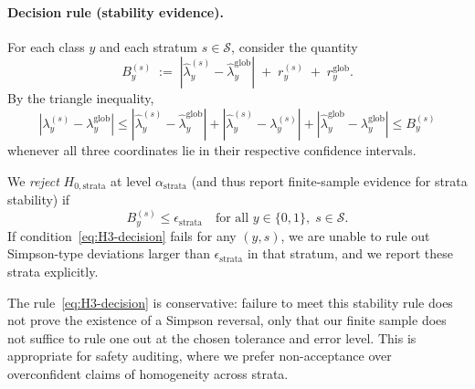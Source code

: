 \paragraph{Decision rule (stability evidence).}
For each class $y$ and each stratum $s \in \mathcal{S}$, consider the
quantity
\begin{equation}
  B_y^{(s)}
  \;:=\;
  |\hat\lambda_y^{(s)} - \hat\lambda_y^{\mathrm{glob}}|
  \;+\; r_y^{(s)} \;+\; r_y^{\mathrm{glob}}.
  \label{eq:simpson-bound}
\end{equation}
By the triangle inequality,
\[
  |\lambda_y^{(s)} - \lambda_y^{\mathrm{glob}}|
  \le
  |\hat\lambda_y^{(s)} - \hat\lambda_y^{\mathrm{glob}}|
  + |\hat\lambda_y^{(s)} - \lambda_y^{(s)}|
  + |\hat\lambda_y^{\mathrm{glob}} - \lambda_y^{\mathrm{glob}}|
  \le B_y^{(s)}
\]
whenever all three coordinates lie in their respective confidence
intervals.

We \emph{reject} $H_{0,\mathrm{strata}}$ at level
$\alpha_{\mathrm{strata}}$ (and thus report finite-sample evidence for
strata stability) if
\begin{equation}
  B_y^{(s)} \le \epsilon_{\mathrm{strata}}
  \quad\text{for all } y \in \{0,1\},\;
  s \in \mathcal{S}.
  \label{eq:H3-decision}
\end{equation}
If condition~\eqref{eq:H3-decision} fails for any $(y,s)$, we are
unable to rule out Simpson-type deviations larger than
$\epsilon_{\mathrm{strata}}$ in that stratum, and we report these
strata explicitly.

\begin{remark}
The rule~\eqref{eq:H3-decision} is conservative: failure to meet this
stability rule does not prove the existence of a Simpson reversal, only
that our finite sample does not suffice to rule one out at the chosen
tolerance and error level.
This is appropriate for safety auditing, where we prefer
non-acceptance over overconfident claims of homogeneity across
strata.
\end{remark}
